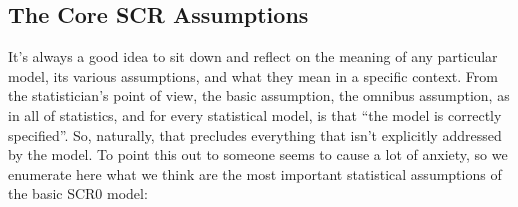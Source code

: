 \subsection{The Core SCR Assumptions}

It's always a good idea to sit down and reflect on the meaning of any
particular model, its various assumptions, and what they mean in a
specific context.  From the statistician's point of view, the basic
assumption, the omnibus assumption, as in all of statistics, and for
every statistical model, is that ``the model is correctly
specified''. So, naturally, that precludes everything that isn't
explicitly addressed by the model.  To point this out to someone seems
to cause a lot of anxiety, so we enumerate here what we think are the
most important statistical assumptions of the basic SCR0 model:

